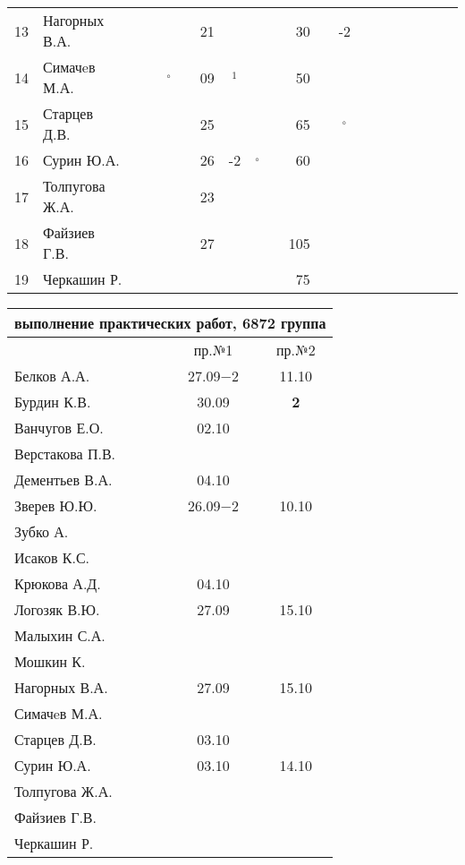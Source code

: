 \documentclass[a4paper,11pt]{article}
\newcommand*\OK{&\small \ding{51}$\!\!_\circ$} %
\newcommand*\Ok{&\small \ding{51}$\!\!_\circ$} %
\newcommand*\ok{&{\small\ding{51}}} %
\newcommand*\no{&{\small }} %
\newcommand*\da{&{\small\ding{48}$\!\!_1$}} %
\begin{document}
\begin{tabular}{l|l|ccccccccrccccccccc}
13& Нагорных В.А.    \ok\ok\ok\ok&21\ok\ok\ok& 30\ok&-2\ok&&&&&\\
14& Симачeв М.А.     \ok\ok\OK\ok&09\da\no\no& 50\no\no\no&&&&&\\
15& Старцев Д.В.     \ok\ok\ok\ok&25\ok\ok\ok& 65\ok\Ok\ok&&&&&\\
16& Сурин Ю.А.       \ok\ok\ok\ok&26&-2\OK\ok& 60\ok\ok\ok&&&&&\\
17& Толпугова Ж.А.   \no\no\no\no&23\ok\no\no \no\no\no\no&&&&&\\
18& Файзиев Г.В.     \ok\ok\ok\ok&27\ok\ok\ok&105\ok\ok\ok&&&&&\\
19& Черкашин Р.      \ok\ok\ok\ok\no\no\no\no& 75\no\ok\ok&&&&&\\ 
\bottomrule
\end{tabular} 

\newpage
\begin{tabular}{l|cc}
\multicolumn{3}{c}{выполнение практических работ, 6872 группа} \\
\toprule
& пр.№1 & пр.№2 \\
\midrule
Белков А.А.    &27.09$-2$&11.10\\   
Бурдин К.В.    &30.09    &{\bf 2}\\
Ванчугов Е.О.  &02.10    &     \\
Верстакова П.В.&         &     \\
Дементьев В.А. &04.10    &     \\
Зверев Ю.Ю.    &26.09$-2$&10.10\\
Зубко А.       &         &     \\
Исаков К.С.    &         &     \\
Крюкова А.Д.   &04.10    &     \\
Логозяк В.Ю.   &27.09    &15.10\\
Малыхин С.А.   &         &     \\
Мошкин К.      &         &     \\
Нагорных В.А.  &27.09    &15.10\\
Симачeв М.А.   &         &     \\
Старцев Д.В.   &03.10    &     \\
Сурин Ю.А.     &03.10    &14.10\\
Толпугова Ж.А. &         &     \\
Файзиев Г.В.   &         &     \\
Черкашин Р.    &         &     \\
\bottomrule
\end{tabular}
\end{document}
